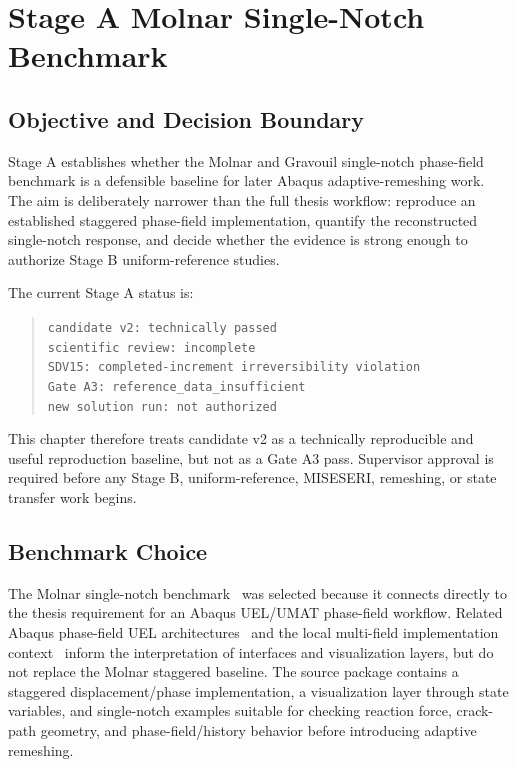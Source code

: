 \chapter{Stage A Molnar Single-Notch Benchmark}

\section{Objective and Decision Boundary}

Stage A establishes whether the Molnar and Gravouil single-notch phase-field
benchmark is a defensible baseline for later Abaqus adaptive-remeshing work.
The aim is deliberately narrower than the full thesis workflow: reproduce an
established staggered phase-field implementation, quantify the reconstructed
single-notch response, and decide whether the evidence is strong enough to
authorize Stage B uniform-reference studies.

The current Stage A status is:

\begin{quote}
\texttt{candidate v2: technically passed}\\
\texttt{scientific review: incomplete}\\
\texttt{SDV15: completed-increment irreversibility violation}\\
\texttt{Gate A3: reference\_data\_insufficient}\\
\texttt{new solution run: not authorized}
\end{quote}

This chapter therefore treats candidate v2 as a technically reproducible and
useful reproduction baseline, but not as a Gate A3 pass. Supervisor approval is
required before any Stage B, uniform-reference, MISESERI, remeshing, or state
transfer work begins.

\section{Benchmark Choice}

The Molnar single-notch benchmark~\cite{molnar2017} was selected because it
connects directly to the thesis requirement for an Abaqus UEL/UMAT phase-field
workflow. Related Abaqus phase-field UEL architectures~\cite{msekh2015} and the
local multi-field implementation context~\cite{diddige2025} inform the
interpretation of interfaces and visualization layers, but do not replace the
Molnar staggered baseline. The source package contains a staggered
displacement/phase implementation, a visualization layer through state
variables, and single-notch examples suitable for checking reaction force,
crack-path geometry, and phase-field/history behavior before introducing
adaptive remeshing.

